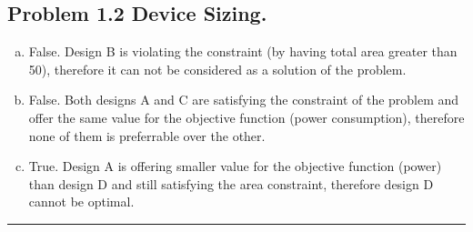 \documentclass[12pt, letterpaper]{article}
\begin{document}
\subsection*{Problem 1.2 \small Device Sizing.} 
\begin{enumerate}[(a)]
    \item False. Design B is violating the constraint (by having total area greater than 50), therefore it can not be considered as a solution of the problem.

    \item False. Both designs A and C are satisfying the constraint of the problem and offer the same value for the objective function (power consumption), therefore none of them is preferrable over the other.

    \item True. Design A is offering smaller value for the objective function (power) than design D and still satisfying the area constraint, therefore design D cannot be optimal.
\end{enumerate}
\hrule
\end{document}
